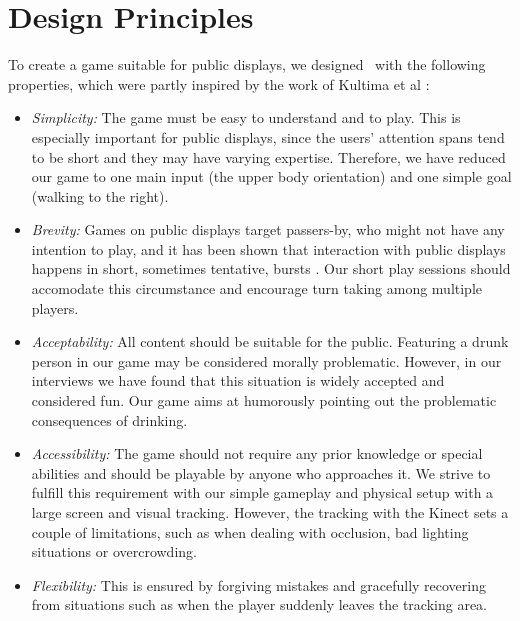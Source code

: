 \documentclass{chi-ext}
\begin{document}
%

\section{Design Principles}
%
To create a game suitable for public displays, we designed \drunkened\ with the following properties, which were partly inspired by the work of Kultima et al \cite{kultima2009casual}:
\begin{itemize}\compresslist
\item \textit{Simplicity:} The game must be easy to understand and to play. This is especially important for public displays, since the users' attention spans tend to be short and they may have varying expertise. Therefore, we have reduced our game to one main input (the upper body orientation) and one simple goal (walking to the right).
\item \textit{Brevity:} Games on public displays target passers-by, who might not have any intention to play, and it has been shown that interaction with public displays happens in short, sometimes tentative, bursts \cite{walter2013strikeapose}. Our short play sessions should accomodate this circumstance and encourage turn taking among multiple players.
\item \textit{Acceptability:} All content should be suitable for the public. Featuring a drunk person in our game may be considered morally problematic. However, in our interviews we have found that this situation is widely accepted and considered fun. Our game aims at humorously pointing out the problematic consequences of drinking.
\item \textit{Accessibility:} The game should not require any prior knowledge or special abilities and should be playable by anyone who approaches it. We strive to fulfill this requirement with our  simple gameplay and physical setup with a large screen and visual tracking. However, the tracking with the Kinect sets a couple of limitations, such as when dealing with occlusion, bad lighting situations or overcrowding.
\item \textit{Flexibility:} This is ensured by forgiving mistakes and gracefully recovering from situations such as when the player suddenly leaves the tracking area.
\end{itemize}
\end{document}
